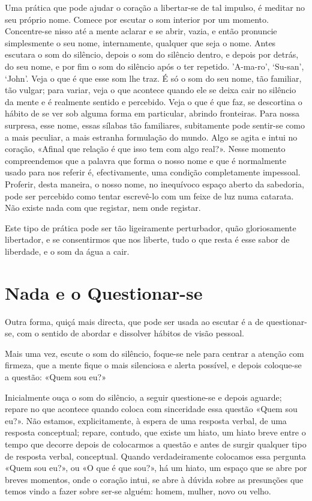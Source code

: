 Uma prática que pode ajudar o coração a libertar-se de tal impulso, é
meditar no seu próprio nome. Comece por escutar o som interior por um
momento. Concentre-se nisso até a mente aclarar e se abrir, vazia, e
então pronuncie simplesmente o seu nome, internamente, qualquer que seja
o nome. Antes escutara o som do silêncio, depois o som do silêncio
dentro, e depois por detrás, do seu nome, e por fim o som do silêncio
após o ter repetido. 'A-ma-ro', `Su-san', `John'. Veja o que é que esse
som lhe traz. É só o som do seu nome, tão familiar, tão vulgar; para
variar, veja o que acontece quando ele se deixa cair no silêncio da
mente e é realmente sentido e percebido. Veja o que é que faz, se
descortina o hábito de se ver sob alguma forma em particular, abrindo
fronteiras. Para nossa surpresa, esse nome, essas sílabas tão
familiares, subitamente pode sentir-se como a mais peculiar, a mais
estranha formulação do mundo. Algo se agita e intui no coração, «Afinal
que relação é que isso tem com algo real?». Nesse momento compreendemos
que a palavra que forma o nosso nome e que é normalmente usado para nos
referir é, efectivamente, uma condição completamente impessoal.
Proferir, desta maneira, o nosso nome, no inequívoco espaço aberto da
sabedoria, pode ser percebido como tentar escrevê-lo com um feixe de luz
numa catarata. Não existe nada com que registar, nem onde registar.

Este tipo de prática pode ser tão ligeiramente perturbador, quão
gloriosamente libertador, e se consentirmos que nos liberte, tudo o que
resta é esse sabor de liberdade, e o som da água a cair.

\section{Nada e o Questionar-se}

Outra forma, quiçá mais directa, que pode ser usada ao escutar é a de
questionar-se, com o sentido de abordar e dissolver hábitos de visão
pessoal.

Mais uma vez, escute o som do silêncio, foque-se nele para centrar a
atenção com firmeza, que a mente fique o mais silenciosa e alerta
possível, e depois coloque-se a questão: «Quem sou eu?»

Inicialmente ouça o som do silêncio, a seguir questione-se e depois
aguarde; repare no que acontece quando coloca com sinceridade essa
questão «Quem sou eu?». Não estamos, explicitamente, à espera de uma
resposta verbal, de uma resposta conceptual; repare, contudo, que existe
um hiato, um hiato breve entre o tempo que decorre depois de colocarmos
a questão e antes de surgir qualquer tipo de resposta verbal,
conceptual. Quando verdadeiramente colocamos essa pergunta «Quem sou
eu?», ou «O que é que sou?», há um hiato, um espaço que se abre por
breves momentos, onde o coração intui, se abre à dúvida sobre as
presunções que temos vindo a fazer sobre ser-se alguém: homem, mulher,
novo ou velho.

